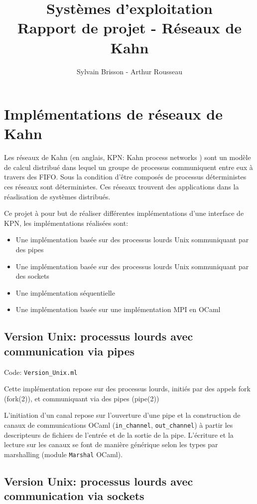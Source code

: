 \documentclass[a4paper]{article}
\title{Systèmes d'exploitation\\Rapport de projet - Réseaux de Kahn}
\author{Sylvain Brisson - Arthur Rousseau}
\date{}
\begin{document}
\maketitle
\noindent

\section{Implémentations de réseaux de Kahn}

Les réseaux de Kahn (en anglais, KPN: Kahn process networks ) sont un modèle de calcul distribué dans lequel un groupe de processus communiquent entre eux à travers des FIFO. Sous la condition d'être composés de processus déterministes ces réseaux sont déterministes. Ces réseaux trouvent des applications dans la réaslisation de systèmes distribués.

Ce projet à pour but de réaliser différentes implémentations d'une interface de KPN, les implémentations réalisées sont:
\begin{itemize}
    \item Une implémentation basée sur des processus lourds Unix sommuniquant par des pipes
    \item Une implémentation basée sur des processus lourds Unix sommuniquant par des sockets
    \item Une implémentation séquentielle 
    \item Une implémentation basée sur une implémentation MPI en OCaml
\end{itemize}

\subsection{Version Unix: processus lourds avec communication via pipes}

Code: \verb|Version_Unix.ml|

Cette implémentation repose sur des processus lourds, initiés par des appels fork (fork(2)), et communiquant via des pipes (pipe(2))

L'initiation d'un canal repose sur l'ouverture d'une pipe et la construction de canaux de communications OCaml (\texttt{in_channel}, \texttt{out_channel}) à partir les descripteurs de fichiers de l'entrée et de la sortie de la pipe. L'écriture et la lecture sur les canaux se font de manière générique selon les types par marshalling (module \verb|Marshal| OCaml).

\subsection{Version Unix: processus lourds avec communication via sockets}
\end{document}
